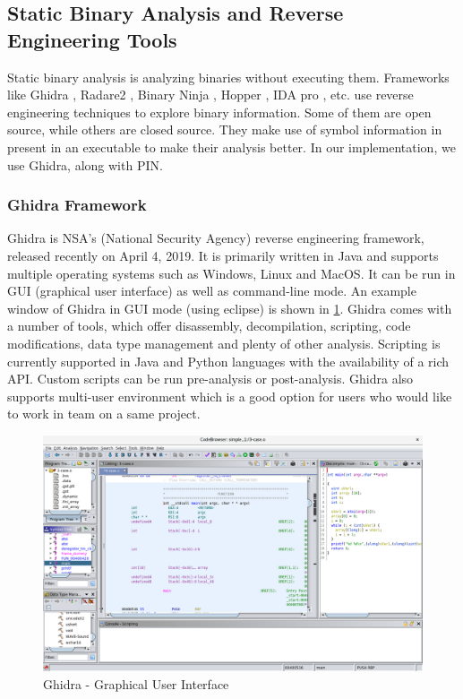 \subsection{Static Binary Analysis and Reverse Engineering Tools}
Static binary analysis is analyzing binaries without executing them. Frameworks like Ghidra \citep{nsaghidra}, Radare2 \citep{radare2}, Binary Ninja \citep{binaryninja}, Hopper \citep{hopper}, IDA pro \citep{idapro}, etc. use reverse engineering techniques to explore binary information. Some of them are open source, while others are closed source. They make use of symbol information in present in an executable to make their analysis better. In our implementation, we use Ghidra, along with PIN.

\subsubsection{Ghidra Framework}
Ghidra is NSA's (National Security Agency) reverse engineering framework, released recently on April 4, 2019. It is primarily written in Java and supports multiple operating systems such as Windows, Linux and MacOS. It can be run in GUI (graphical user interface) as well as command-line mode. An example window of Ghidra in GUI mode (using eclipse) is shown in \cref{fig:fig24}. Ghidra comes with a number of tools, which offer disassembly, decompilation, scripting, code modifications, data type management and plenty of other analysis. Scripting is currently supported in Java and Python languages with the availability of a rich API. Custom scripts can be run pre-analysis or post-analysis. Ghidra also supports multi-user environment which is a good option for users who would like to work in team on a same project.

\begin{figure}
\centering
\includegraphics[width=165mm]{images/ghidra.png}
\caption{Ghidra - Graphical User Interface\label{fig:fig24}}
\end{figure}